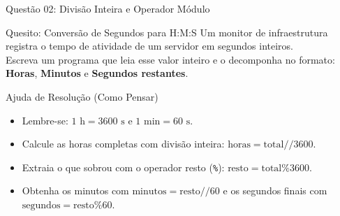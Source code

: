 \begin{frame}{Questão 02: Divisão Inteira e Operador Módulo}
    \begin{block}{Quesito: Conversão de Segundos para H:M:S}
        Um monitor de infraestrutura registra o tempo de atividade de um servidor em segundos inteiros. \\
        Escreva um programa que leia esse valor inteiro e o decomponha no formato: \textbf{Horas}, \textbf{Minutos} e \textbf{Segundos restantes}.
    \end{block}

    \begin{exampleblock}{Ajuda de Resolução (Como Pensar)}
        \begin{itemize}
            \item Lembre-se: $1\text{ h} = 3600\text{ s}$ e $1\text{ min} = 60\text{ s}$.
            \item Calcule as horas completas com divisão inteira: $\text{horas} = \text{total} // 3600$.
            \item Extraia o que sobrou com o operador resto (\texttt{\%}): $\text{resto} = \text{total} \% 3600$.
            \item Obtenha os minutos com $\text{minutos} = \text{resto} // 60$ e os segundos finais com $\text{segundos} = \text{resto} \% 60$.
        \end{itemize}
    \end{exampleblock}
\end{frame}

